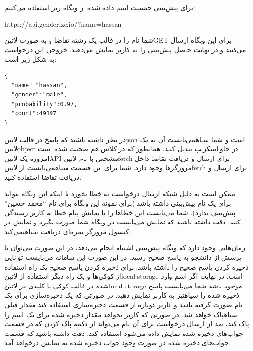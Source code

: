برای پیش‌بینی جنسیت اسم داده شده از وبگاه زیر استفاده می‌کنیم:

\begin{latin}\begin{center}
		https://api.genderize.io/?name=hassan
	\end{center}\end{latin}

شما نام را در قالب یک رشته تقاضا و به صورت ‌لاتین{GET} برای این وبگاه ارسال می‌کنید و در نهایت حاصل پیش‌بینی را به کاربر نمایش می‌دهید. خروجی این درخواست به شکل زیر است:

\begin{latin}
	\begin{verbatim}
{
  "name":"hassan",
  "gender":"male",
  "probability":0.97,
  "count":49197
}
\end{verbatim}
\end{latin}

در نظر داشته باشید که پاسخ در قالب ‌لاتین{json} است و شما ‌سیاه{می‌بایست} آن به یک ‌لاتین{object} در جاوااسکریپ تبدیل کنید.
همانطور که در کلاس هم صحبت شده است امروزه یک ‌لاتین{API} مشخص با نام ‌لاتین{fetch} برای ارسال و دریافت تقاضا داخل مرورگرها وجود دارد.
شما برای این قسمت ‌سیاه{می‌بایست} از ‌لاتین{fetch} برای ارسال و دریافت تقاضا استفاده کنید.

ممکن است به دلیل شبکه ارسال درخواست به خطا بخورد یا اینکه این وبگاه نتواند برای یک نام پیش‌بینی داشته باشد (برای نمونه این وبگاه برای نام ``محمد حسین'' پیش‌بینی ندارد).
شما می‌بایست این خطاها را با نمایش پیام خطا به کاربر رسیدگی کنید.
دقت داشته باشید که نمایش می‌بایست در وبگاه شما صورت بگیرد و نمایش در کنسول مرورگر نمره‌ای دریافت ‌سیاه{نمی‌کند}.


زمان‌هایی وجود دارد که وبگاه پیش‌بینی اشتباه انجام می‌دهد، در این صورت می‌توان با پرسش از دانشجو به پاسخ صحیح رسید. در این صورت این سامانه می‌بایست توانایی ذخیره کردن پاسخ صحیح را داشته باشد. برای ذخیره کردن پاسخ صحیح یک راه استفاده از کوکی‌ها و یک راه دیگر استفاده از ‌لاتین{local storage} است.
در نهایت اگر اسم وارد شده در قالب کوکی یا کلیدی در ‌لاتین{local storage} موجود باشد شما می‌بایست پاسخ ذخیره شده را ‌سیاه{نیز} به کاربر نمایش دهید.
در صورتی که یک ذخیره‌سازی برای یک نام صورت گرفته باشد و کاربر دوباره از قسمت ذخیره‌سازی استفاده کند مقدار قبلی ‌سیاه{پاک} خواهد شد.
در صورتی که کاربر بخواهد مقدار ذخیره شده برای یک اسم را پاک کند، بعد از ارسال درخواست برای آن نام می‌تواند از دکمه پاک کردن که در قسمت جواب‌های ذخیره شده نمایش داده می‌شود استفاده کند. دقت داشته باشید که قسمت جواب‌های ذخیره شده
در صورت وجود جواب ذخیره شده به نمایش درخواهد آمد.

